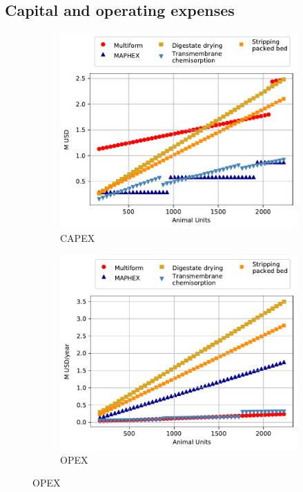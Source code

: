 \begin{refsection}[referencesApD]
\section{Capital and operating expenses}
\begin{figure}[h!]
	\centering 
	\begin{subfigure}[t]{0.7\textwidth}
		\centering
		\includegraphics[width=1\linewidth, trim={0cm 0cm 0cm 0cm},clip]{gfx/AppendixD/EquipCost.pdf} 
		\caption{CAPEX}
		\label{fig:CAPEX}
	\end{subfigure}

	\bigskip

	\begin{subfigure}[t]{0.7\textwidth}
		\centering
		\includegraphics[width=1\linewidth, trim={0cm 0cm 0cm 0cm},clip]{gfx/AppendixD/OpCost.pdf} 
		\caption{OPEX}
		\label{fig:OPEX}
	\end{subfigure}
	

\end{figure}
\end{refsection}
